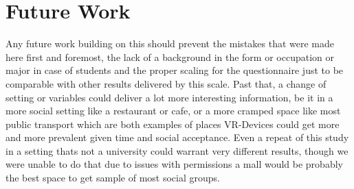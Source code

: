 \documentclass[sigchi]{acmart}
\begin{document}
\section {Future Work}
Any future work building on this should prevent the mistakes that were made here first and foremost, the lack of a background in the form or occupation or major in case of students and the proper scaling for the questionnaire just to be comparable with other results delivered by this scale. Past that, a change of setting or variables could deliver a lot more interesting information, be it in a more social setting like a restaurant or cafe, or a more cramped space like most public transport which are both examples of places VR-Devices could get more and more prevalent given time and social acceptance.  Even a repeat of this study in a setting thats not a university could warrant very different results, though we were unable to do that due to issues with permissions a mall would be probably the best space to get sample of most social groups.




\appendix
\listoffigures
\end{document}
